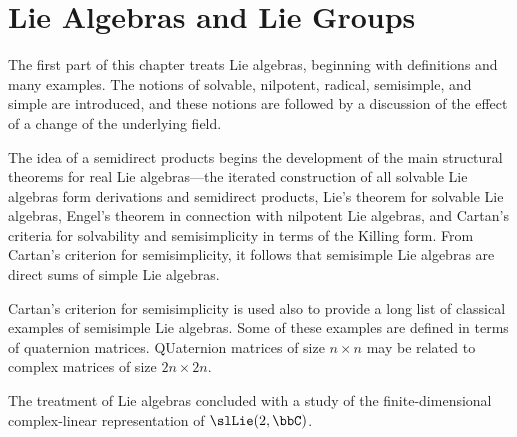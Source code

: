 \section{Lie Algebras and Lie Groups}
The first part of this chapter treats Lie algebras, beginning with
definitions and many examples. The notions of solvable, nilpotent, radical,
semisimple, and simple are introduced, and these notions are followed by a
discussion of the effect of a change of the underlying field.

The idea of a semidirect products begins the development of the main
structural theorems for real Lie algebras---the iterated construction of
all solvable Lie algebras form derivations and semidirect products, Lie's
theorem for solvable Lie algebras, Engel's theorem in connection with
nilpotent Lie algebras, and Cartan's criteria for solvability and
semisimplicity in terms of the Killing form. From Cartan's criterion for
semisimplicity, it follows that semisimple Lie algebras are direct sums of
simple Lie algebras.

Cartan's criterion for semisimplicity is used also to provide a long list
of classical examples of semisimple Lie algebras. Some of these examples
are defined in terms of quaternion matrices. QUaternion matrices of size
$n\times n$ may be related to complex matrices of size $2n\times 2n$.

The treatment of Lie algebras concluded with a study of the
finite-dimensional complex-linear representation of $\slLie(2,\bbC)$.


